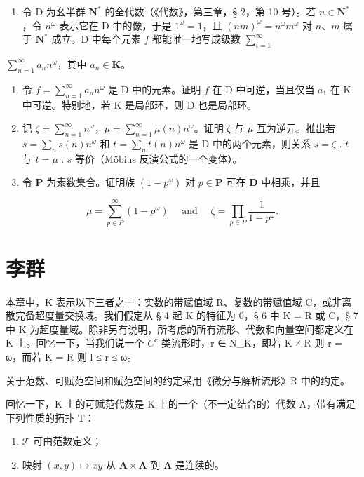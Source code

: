 \begin{enumerate}
\def\labelenumi{\arabic{enumi}.}
\setcounter{enumi}{1}
\tightlist
\item
  令 D 为幺半群 \(\mathbf{N}^*\) 的全代数（《代数》，第三章，§ 2，第 10 号）。若 \(n \in \mathbf{N}^*\)，令 \(n^\omega\) 表示它在 D 中的像，于是 \(1^\omega = 1\)，且 \((nm)^\omega = n^\omega m^\omega\) 对 \(n\)、\(m\) 属于 \(\mathbf{N}^*\) 成立。D 中每个元素 \(f\) 都能唯一地写成级数 \(\sum_{i=1}^{\infty}\)
\end{enumerate}

\(\sum_{n=1}^{\infty} a_n n^\omega\)，其中 \(a_n \in \mathbf{K}\)。

\begin{enumerate}
\def\labelenumi{(\alph{enumi})}
\item
  令 \(f = \sum_{n=1}^{\infty} a_n n^\omega\) 是 D 中的元素。证明 \(f\) 在 D 中可逆，当且仅当 \(a_1\) 在 K 中可逆。特别地，若 K 是局部环，则 D 也是局部环。
\item
  记 \(\zeta = \sum_{n=1}^{\infty} n^{\omega}\)，\(\mu = \sum_{n=1}^{\infty} \mu(n)n^{\omega}\)。证明 \(\zeta\) 与 \(\mu\) 互为逆元。推出若 \(s = \sum_{n} s(n)n^{\omega}\) 和 \(t = \sum_{n} t(n)n^{\omega}\) 是 D 中的两个元素，则关系 \(s = \zeta\) . \(t\) 与 \(t = \mu\) . \(s\) 等价（Möbius 反演公式的一个变体）。
\item
  令 \(\mathbf{P}\) 为素数集合。证明族 \((1 - p^{\omega})\) 对 \(p\in \mathbf{P}\) 可在 \(\mathbf{D}\) 中相乘，并且
\end{enumerate}

\[
\mu = \sum_ {p \in P} ^ {\infty} (1 - p ^ {\omega}) \quad \text { and } \quad \zeta = \prod_ {p \in P} \frac {1}{1 - p ^ {\omega}}.
\]

\chapter{李群}

本章中，K 表示以下三者之一：实数的带赋值域 R、复数的带赋值域 C，或非离散完备超度量交换域。我们假定从 § 4 起 K 的特征为 0，§ 6 中 K = R 或 C，§ 7 中 K 为超度量域。除非另有说明，所考虑的所有流形、代数和向量空间都定义在 K 上。回忆一下，当我们说一个 \(C^{r}\) 类流形时，r ∈ N\_K，即若 K ≠ R 则 r = ω，而若 K = R 则 l ≤ r ≤ ω。

关于范数、可赋范空间和赋范空间的约定采用《微分与解析流形》R 中的约定。

回忆一下，K 上的可赋范代数是 K 上的一个（不一定结合的）代数 A，带有满足下列性质的拓扑 T：

\begin{enumerate}
\def\labelenumi{(\arabic{enumi})}
\item
  \(\mathcal{T}\) 可由范数定义；
\item
  映射 \((x,y)\mapsto xy\) 从 \(\mathbf{A}\times \mathbf{A}\) 到 \(\mathbf{A}\) 是连续的。
\end{enumerate}

